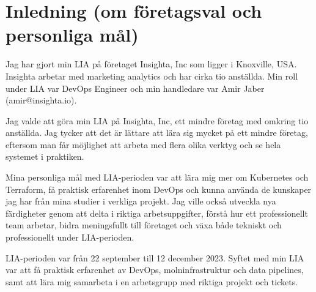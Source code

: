 \section{Inledning (om företagsval och personliga mål)}
\label{sec:inledning}

Jag har gjort min LIA på företaget Insighta, Inc som ligger i Knoxville, USA. Insighta arbetar med marketing analytics och har cirka tio anställda. Min roll under LIA var DevOps Engineer och min handledare var Amir Jaber (amir@insighta.io). 

Jag valde att göra min LIA på Insighta, Inc, ett mindre företag med omkring tio anställda. Jag tycker att det är lättare att lära sig mycket på ett mindre företag, eftersom man får möjlighet att arbeta med flera olika verktyg och se hela systemet i praktiken.

Mina personliga mål med LIA-perioden var att lära mig mer om Kubernetes och Terraform, få praktisk erfarenhet inom DevOps och kunna använda de kunskaper jag har från mina studier i verkliga projekt. Jag ville också utveckla nya färdigheter genom att delta i riktiga arbetsuppgifter, förstå hur ett professionellt team arbetar, bidra meningsfullt till företaget och växa både tekniskt och professionellt under LIA-perioden.

LIA-perioden var från 22 september till 12 december 2023. Syftet med min LIA var att få praktisk erfarenhet av DevOps, molninfrastruktur och data pipelines, samt att lära mig samarbeta i en arbetsgrupp med riktiga projekt och tickets.